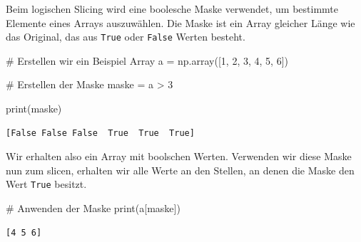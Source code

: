 \documentclass[
  letterpaper,
  DIV=11,
  numbers=noendperiod]{scrreprt}
\newenvironment{Shaded}{\begin{snugshade}}{\end{snugshade}}
\newcommand{\BuiltInTok}[1]{\textcolor[rgb]{0.00,0.23,0.31}{#1}}
\newcommand{\CommentTok}[1]{\textcolor[rgb]{0.37,0.37,0.37}{#1}}
\newcommand{\DecValTok}[1]{\textcolor[rgb]{0.68,0.00,0.00}{#1}}
\newcommand{\NormalTok}[1]{\textcolor[rgb]{0.00,0.23,0.31}{#1}}
\newcommand{\OperatorTok}[1]{\textcolor[rgb]{0.37,0.37,0.37}{#1}}
\begin{document}
Beim logischen Slicing wird eine boolesche Maske verwendet, um bestimmte
Elemente eines Arrays auszuwählen. Die Maske ist ein Array gleicher
Länge wie das Original, das aus \texttt{True} oder \texttt{False} Werten
besteht.

\begin{Shaded}
\begin{Highlighting}[]
\CommentTok{\# Erstellen wir ein Beispiel Array}
\NormalTok{a }\OperatorTok{=}\NormalTok{ np.array([}\DecValTok{1}\NormalTok{, }\DecValTok{2}\NormalTok{, }\DecValTok{3}\NormalTok{, }\DecValTok{4}\NormalTok{, }\DecValTok{5}\NormalTok{, }\DecValTok{6}\NormalTok{])}

\CommentTok{\# Erstellen der Maske}
\NormalTok{maske }\OperatorTok{=}\NormalTok{ a }\OperatorTok{\textgreater{}} \DecValTok{3}

\BuiltInTok{print}\NormalTok{(maske)}
\end{Highlighting}
\end{Shaded}

\begin{verbatim}
[False False False  True  True  True]
\end{verbatim}

Wir erhalten also ein Array mit boolschen Werten. Verwenden wir diese
Maske nun zum slicen, erhalten wir alle Werte an den Stellen, an denen
die Maske den Wert \texttt{True} besitzt.

\begin{Shaded}
\begin{Highlighting}[]
\CommentTok{\# Anwenden der Maske}
\BuiltInTok{print}\NormalTok{(a[maske])}
\end{Highlighting}
\end{Shaded}

\begin{verbatim}
[4 5 6]
\end{verbatim}
\end{document}
